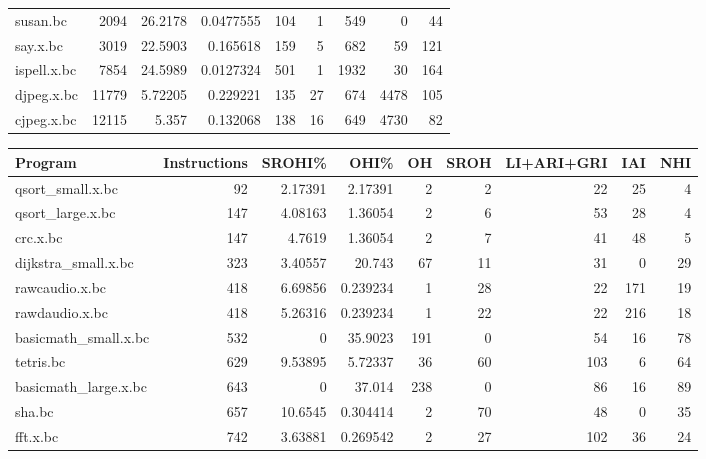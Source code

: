 \begin{tabular}{lrrrrrrrr}
 susan.bc             &     2094 & 26.2178   &  0.0477555 &  104 &    1 &    549 &     0 &    44 \\
 say.x.bc             &     3019 & 22.5903   &  0.165618  &  159 &    5 &    682 &    59 &   121 \\
 ispell.x.bc          &     7854 & 24.5989   &  0.0127324 &  501 &    1 &   1932 &    30 &   164 \\
 djpeg.x.bc           &    11779 &  5.72205  &  0.229221  &  135 &   27 &    674 &  4478 &   105 \\
 cjpeg.x.bc           &    12115 &  5.357    &  0.132068  &  138 &   16 &    649 &  4730 &    82 \\
\hline
\end{tabular}\begin{tabular}{lrrrrrrrr}
\hline
 Program              &   Instructions &    SROHI\% &       OHI\% &   OH &   SROH &   LI+ARI+GRI &   IAI &   NHI \\
\hline
 qsort\_small.x.bc     &             92 &  2.17391  &  2.17391   &    2 &      2 &           22 &    25 &     4 \\
 qsort\_large.x.bc     &            147 &  4.08163  &  1.36054   &    2 &      6 &           53 &    28 &     4 \\
 crc.x.bc             &            147 &  4.7619   &  1.36054   &    2 &      7 &           41 &    48 &     5 \\
 dijkstra\_small.x.bc  &            323 &  3.40557  & 20.743     &   67 &     11 &           31 &     0 &    29 \\
 rawcaudio.x.bc       &            418 &  6.69856  &  0.239234  &    1 &     28 &           22 &   171 &    19 \\
 rawdaudio.x.bc       &            418 &  5.26316  &  0.239234  &    1 &     22 &           22 &   216 &    18 \\
 basicmath\_small.x.bc &            532 &  0        & 35.9023    &  191 &      0 &           54 &    16 &    78 \\
 tetris.bc            &            629 &  9.53895  &  5.72337   &   36 &     60 &          103 &     6 &    64 \\
 basicmath\_large.x.bc &            643 &  0        & 37.014     &  238 &      0 &           86 &    16 &    89 \\
 sha.bc               &            657 & 10.6545   &  0.304414  &    2 &     70 &           48 &     0 &    35 \\
 fft.x.bc             &            742 &  3.63881  &  0.269542  &    2 &     27 &          102 &    36 &    24 \\

\end{tabular}

